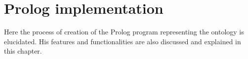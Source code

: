 \chapter{Prolog implementation}

Here the process of creation of the Prolog program representing the ontology is elucidated. His features and functionalities are also discussed and explained in this chapter.




